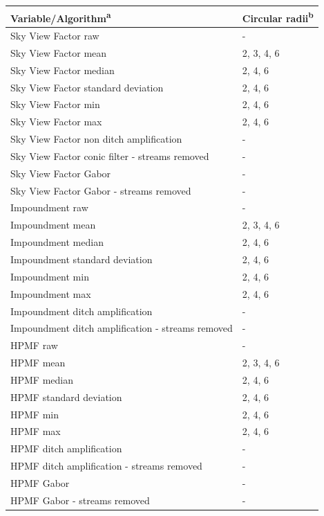 \documentclass[]{interact}
\theoremstyle{plain}%
\theoremstyle{definition}
\theoremstyle{remark}
\begin{document}
\begin{table} [!htb]
    {\begin{tabular}{ll} \toprule
      Variable/Algorithm\textsuperscript{a} & Circular radii\textsuperscript{b} \\ \midrule
      
      Sky View Factor raw & -\\
      Sky View Factor mean & 2, 3, 4, 6 \\
      Sky View Factor median &2, 4, 6 \\
      Sky View Factor standard deviation & 2, 4, 6 \\
      Sky View Factor min & 2, 4, 6 \\
      Sky View Factor max & 2, 4, 6 \\
      Sky View Factor non ditch amplification & - \\ 
      Sky View Factor conic filter - streams removed & - \\ 
      Sky View Factor Gabor & - \\
      Sky View Factor Gabor - streams removed & -\\
      
      Impoundment raw & - \\
      Impoundment mean & 2, 3, 4, 6 \\
      Impoundment median & 2, 4, 6 \\
      Impoundment standard deviation & 2, 4, 6 \\
      Impoundment min & 2, 4, 6 \\
      Impoundment max & 2, 4, 6 \\
      Impoundment ditch amplification & - \\
      Impoundment ditch amplification - streams removed & - \\
      
      HPMF raw & - \\
      HPMF mean & 2, 3, 4, 6 \\
      HPMF median & 2, 4, 6 \\
      HPMF standard deviation & 2, 4, 6 \\
      HPMF min & 2, 4, 6 \\
      HPMF max & 2, 4, 6 \\
      HPMF ditch amplification & - \\
      HPMF ditch amplification - streams removed & - \\
      HPMF Gabor & -\\
      HPMF Gabor - streams removed & -\\
      

\end{tabular}}
\end{table}
\end{document}
